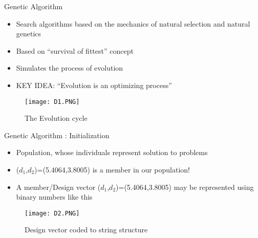 \documentclass{beamer}
\begin{document}
\begin{frame}{Genetic Algorithm}

\begin{itemize}
  \item Search algorithms based on the mechanics of natural selection and natural genetics
  \item Based on “survival of fittest” concept
  \item Simulates the process of evolution
  \item KEY IDEA: “Evolution is an optimizing process”
\end{itemize}
\vskip 0.1cm
\begin{figure}
\texttt{[image: D1.PNG]}
\caption{\label{fig:your-figure9}The Evolution cycle}
\end{figure}
\end{frame}

\begin{frame}{Genetic Algorithm : Initialization}

\begin{itemize}
  \item Population, whose individuals represent solution
to problems
\item ($d_{1}$,$d_{2}$)=(5.4064,3.8005) is a member in our population!
\item A member/Design vector ($d_{1}$,$d_{2}$)=(5.4064,3.8005) may be represented using binary numbers like this

\end{itemize}
\begin{figure}
\texttt{[image: D2.PNG]}
\caption{\label{fig:your-figure10} Design vector coded to string structure}
\end{figure}
\end{frame}
\end{document}

